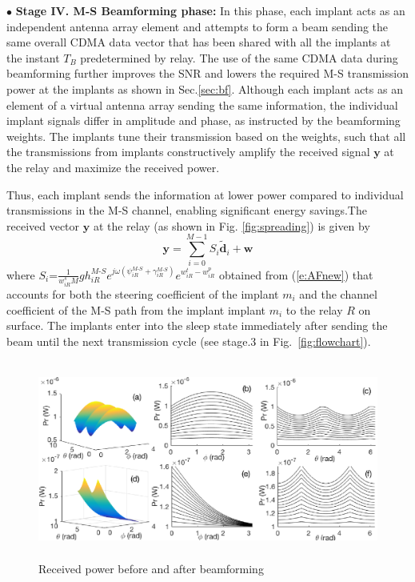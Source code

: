 \noindent $\bullet$ \textbf{ Stage IV. M-S Beamforming phase:}
In this phase, each implant acts as an independent antenna array element and attempts to form a beam sending the same overall CDMA data vector that has been shared with all the implants at the instant $T_B$ predetermined by relay. The use of the same CDMA data during beamforming further improves the  SNR and lowers the required M-S transmission power at the implants as shown in Sec.\ref{sec:bf}. Although each implant acts as an element of a virtual antenna array sending the same information, the individual implant signals differ in amplitude and phase, as instructed by the beamforming weights. The implants tune their transmission based on the weights, such that all the transmissions from implants constructively amplify the received signal $\mathbf{y}$ at the relay and maximize the received power.

Thus, each implant sends the information at lower power compared to individual transmissions in the M-S channel, enabling significant energy savings.The received vector $\mathbf{y}$ at the relay (as shown in Fig. \ref{fig:spreading}) is given by
\begin{equation}
	\mathbf{y}=\sum_{i=0}^{M-1} S_{i} \tilde{\mathbf{d}}_i + \mathbf{w}
	\label{eqCDMA3}
\end{equation}
where $S_{i}$=$\frac{1}{w_{iR}^sM}gh_{iR}^{M\text{-}S}e^{j\omega\left(\psi_{iR}^{M\text{-}S}+\gamma_{iR}^{M\text{-}S} \right)} e^{w^{t}_{iR} - w_{iR}^p}$ obtained from (\ref{e:AFnew}) that accounts for both the steering coefficient of the implant $m_i$ and the channel coefficient of the M-S path from the implant implant $m_i$ to the relay $R$ on surface. The implants enter into the sleep state immediately after sending the beam until the next transmission cycle (see stage.3 in Fig.~\ref{fig:flowchart}).

\begin{figure}[t]
 \centering
 \vspace{-2mm}  %
\includegraphics[width=17cm,height=6.5cm]{figures/GC_beamforming/multi.eps}  
 \caption{\label{fig:multi} Received power before and after beamforming}
 \vspace{-5mm}
  \end{figure}
  
